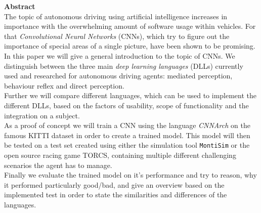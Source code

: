 {\bf\Large Abstract} \\ [1em]
The topic of autonomous driving using artificial intelligence increases in importance with the overwhelming amount of software usage within vehicles. For that \textit{Convolutional Neural Networks} (CNNs), which try to figure out the importance of special areas of a single picture, have been shown to be promising. \\
In this paper we will give a general introduction to the topic of CNNs.
We distinguish between the three main \textit{deep learning languages} (DLLs) currently used and researched for autonomous driving agents: mediated perception, behaviour reflex and direct perception.\\
Further we will compare different languages, which can be used to implement the different DLLs, based on the factors of usability, scope of functionality and the integration on a subject.\\
As a proof of concept we will train a CNN using the language \textit{CNNArch} on the famous KITTI dataset in order to create a trained model. This model will then be tested on a test set created using either the simulation tool \texttt{MontiSim} or the open source racing game TORCS, containing multiple different challenging scenarios the agent has to manage.\\
Finally we evaluate the trained model on it's performance and try to reason, why it performed particularly good/bad, and give an overview based on the implemented test in order to state the similarities and differences of the languages.

\cleardoublepage
